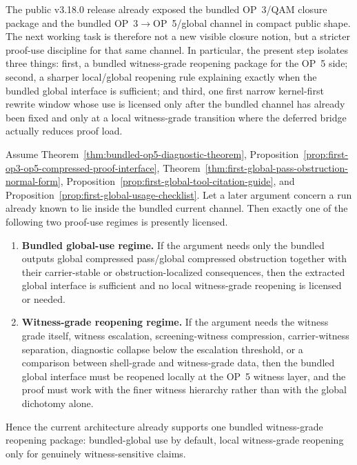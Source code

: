 \begin{remark}
The public v3.18.0 release already exposed the bundled OP~3/QAM closure package and the bundled OP~3$\to$OP~5/global channel in compact public shape. The next working task is therefore not a new visible closure notion, but a stricter proof-use discipline for that same channel. In particular, the present step isolates three things: first, a bundled witness-grade reopening package for the OP~5 side; second, a sharper local/global reopening rule explaining exactly when the bundled global interface is sufficient; and third, one first narrow kernel-first rewrite window whose use is licensed only after the bundled channel has already been fixed and only at a local witness-grade transition where the deferred bridge actually reduces proof load.
\end{remark}

\begin{theorem}
\label{thm:bundled-witness-grade-reopening-package}
Assume Theorem~\ref{thm:bundled-op5-diagnostic-theorem}, Proposition~\ref{prop:first-op3-op5-compressed-proof-interface}, Theorem~\ref{thm:first-global-pass-obstruction-normal-form}, Proposition~\ref{prop:first-global-tool-citation-guide}, and Proposition~\ref{prop:first-global-usage-checklist}. Let a later argument concern a run already known to lie inside the bundled current channel. Then exactly one of the following two proof-use regimes is presently licensed.
\begin{enumerate}[leftmargin=2em,label=(\roman*)]
\item \textbf{Bundled global-use regime.} If the argument needs only the bundled outputs global compressed pass/global compressed obstruction together with their carrier-stable or obstruction-localized consequences, then the extracted global interface is sufficient and no local witness-grade reopening is licensed or needed.
\item \textbf{Witness-grade reopening regime.} If the argument needs the witness grade itself, witness escalation, screening-witness compression, carrier-witness separation, diagnostic collapse below the escalation threshold, or a comparison between shell-grade and witness-grade data, then the bundled global interface must be reopened locally at the OP~5 witness layer, and the proof must work with the finer witness hierarchy rather than with the global dichotomy alone.
\end{enumerate}
Hence the current architecture already supports one bundled witness-grade reopening package: bundled-global use by default, local witness-grade reopening only for genuinely witness-sensitive claims.
\end{theorem}

